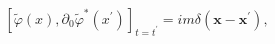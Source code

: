 \begin{equation}
\left[ \widetilde{ \varphi }(x),\partial_0 \widetilde{\varphi
}^{*}(x^{\prime })\right] _{t=t^{\prime }}=im\delta
(\mathbf{x}-\mathbf{x}^{\prime }) , \label{86}
\end{equation}

